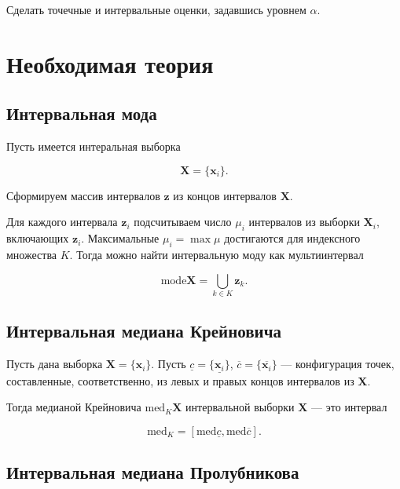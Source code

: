 \documentclass{article}
\begin{document}
  Сделать точечные и интервальные оценки, задавшись уровнем \( \alpha \).

  \section{Необходимая теория}

  \subsection{Интервальная мода}

  Пусть имеется интеральная выборка

  \[
    \mathbf{X} = \{ \mathbf{x}_i \}.
  \]

  Сформируем массив интервалов \( \mathbf{z} \) из концов интервалов
  \( \mathbf{X} \).

  Для каждого интервала \( \mathbf{z}_i \) подсчитываем число \( \mu_i \)
  интервалов из выборки \( \mathbf{X}_i \), включающих \( \mathbf{z}_i \).
  Максимальные \( \mu_i = \max \mu \) достигаются для индексного множества
  \( K \). Тогда можно найти интервальную моду как мультиинтервал

  \begin{equation}
    \text{mode} \mathbf{X} = \bigcup_{k \in K} \mathbf{z}_k.
  \end{equation}

  \subsection{Интервальная медиана Крейновича}

  Пусть дана выборка \( \mathbf{X} = \{ \mathbf{x}_i \} \). Пусть
  \( \underline c = \{ \underline{\mathbf{x}_i} \} \),
  \( \overline c = \{ \overline{\mathbf{x}_i} \} \) --- конфигурация
  точек, составленные, соответственно, из левых и правых концов интервалов
  из \( \mathbf{X} \).

  Тогда медианой Крейновича \( \text{med}_K \mathbf{X} \) интервальной
  выборки \( \mathbf{X} \) --- это интервал

  \begin{equation}
    \text{med}_K = [\text{med} \underline c, \text{med} \overline c].
  \end{equation}

  \subsection{Интервальная медиана Пролубникова}
\end{document}
